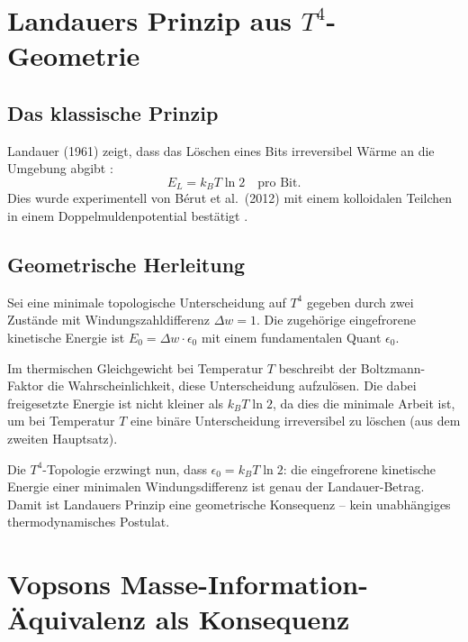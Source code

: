 \section{Landauers Prinzip aus \(T^4\)-Geometrie}

\subsection{Das klassische Prinzip}

Landauer (1961) zeigt, dass das Löschen eines Bits
irreversibel Wärme an die Umgebung abgibt \cite{Landauer1961}:
\begin{equation}
  E_L = k_B T \ln 2 \quad \text{pro Bit.}
  \label{eq:landauer}
\end{equation}
Dies wurde experimentell von Bérut et al.\ (2012) mit einem
kolloidalen Teilchen in einem Doppelmuldenpotential bestätigt
\cite{Berut2012}.

\subsection{Geometrische Herleitung}

Sei eine minimale topologische Unterscheidung auf \(T^4\) gegeben
durch zwei Zustände mit Windungszahldifferenz \(\Delta w = 1\).
Die zugehörige eingefrorene kinetische Energie ist
\(E_0 = \Delta w \cdot \epsilon_0\) mit einem fundamentalen Quant \(\epsilon_0\).

Im thermischen Gleichgewicht bei Temperatur \(T\) beschreibt der
Boltzmann-Faktor die Wahrscheinlichkeit, diese Unterscheidung aufzulösen.
Die dabei freigesetzte Energie ist nicht kleiner als \(k_B T \ln 2\),
da dies die minimale Arbeit ist, um bei Temperatur \(T\) eine binäre
Unterscheidung irreversibel zu löschen (aus dem zweiten Hauptsatz).

Die \(T^4\)-Topologie erzwingt nun, dass
\(\epsilon_0 = k_B T \ln 2\):
die eingefrorene kinetische Energie einer minimalen Windungsdifferenz
ist genau der Landauer-Betrag. Damit ist Landauers Prinzip eine
geometrische Konsequenz -- kein unabhängiges thermodynamisches Postulat.

\section{Vopsons Masse-Information-Äquivalenz als Konsequenz}

